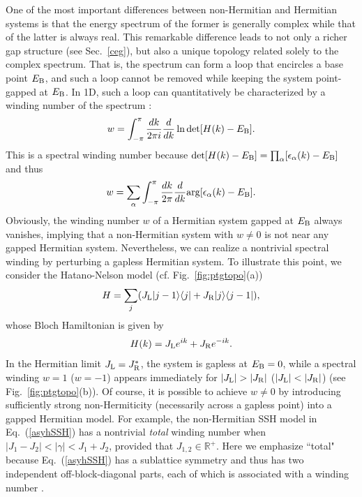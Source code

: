 \documentclass{tADP2e}
\theoremstyle{plain}
\theoremstyle{plain}
\theoremstyle{definition}
\begin{document}
\vspace{3pt}
\noindent
One of the most important differences between non-Hermitian and Hermitian systems is that the energy spectrum of the former is generally complex while that of the latter is always real. This remarkable difference leads to not only a richer gap structure (see Sec.~\ref{ceg}), but also a unique topology related solely to the complex spectrum. That is, the spectrum can form a loop that encircles a base point $E_{\rm B}$, and such a loop cannot be removed while keeping the system point-gapped at $E_{\rm B}$. In 1D, such a loop can quantitatively be characterized by a winding number of the spectrum \cite{ZG18}: 
\begin{equation}
w=\int^\pi_{-\pi}\frac{dk}{2\pi i} \frac{d}{dk}\ln\det[H(k)-E_{\rm B}].
\label{NHwn}
\end{equation} 
This is a spectral winding number because  
$\det[H(k)-E_{\rm B}]=\prod_\alpha [\epsilon_\alpha(k)-E_{\rm B}]$ and thus 
\begin{equation}
w=\sum_\alpha\int^\pi_{-\pi}\frac{dk}{2\pi} \frac{d}{dk}{\rm arg}[\epsilon_\alpha(k)-E_{\rm B}].
\end{equation}
Obviously, the winding number $w$ of a Hermitian system gapped at $E_{\rm B}$ always vanishes, implying that a non-Hermitian system with $w\neq0$ is not near any gapped Hermitian system. Nevertheless, we can realize a nontrivial spectral winding by perturbing a gapless Hermitian system. To illustrate this point, we consider the Hatano-Nelson model \cite{HN96} (cf. Fig.~\ref{fig:ptgtopo}(a))
\begin{equation}
H=\sum_j(J_{\rm L}|j-1\rangle\langle j|+J_{\rm R}|j\rangle\langle j-1|),
\label{RSHN}
\end{equation}
whose Bloch Hamiltonian is given by
\begin{equation}
H(k)=J_{\rm L}e^{ik}+J_{\rm R}e^{-ik}.
\label{KHN}
\end{equation}
In the Hermitian limit $J_{\rm L}=J_{\rm R}^*$, the system is gapless at $E_{\rm B}=0$, while a spectral winding $w=1$ ($w=-1$) appears immediately for $|J_{\rm L}|>|J_{\rm R}|$ ($|J_{\rm L}|<|J_{\rm R}|$) (see Fig.~\ref{fig:ptgtopo}(b)). Of course, it is possible to achieve $w\neq0$ by introducing sufficiently strong non-Hermiticity (necessarily across a gapless point) into a gapped Hermitian model. For example,  
the non-Hermitian SSH model %
in Eq.~(\ref{asyhSSH}) has a nontrivial \emph{total} winding number when $|J_1-J_2|<|\gamma|<J_1+J_2$, provided that $J_{1,2}\in\mathbb{R}^+$. Here we emphasize ``total" because Eq.~(\ref{asyhSSH}) has a sublattice symmetry and thus has two independent off-block-diagonal parts, each of which is associated with a winding number \cite{ZG18}. 
\end{document}
